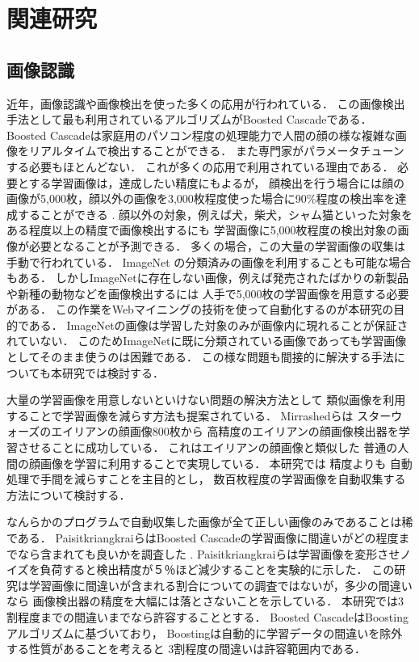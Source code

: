 \chapter{関連研究}
\label{sec:related}

\section{画像認識}

近年，画像認識や画像検出を使った多くの応用が行われている．
この画像検出手法として最も利用されているアルゴリズムがBoosted Cascade\cite{Viola01rapidobject}である．
Boosted Cascadeは家庭用のパソコン程度の処理能力で人間の顔の様な複雑な画像をリアルタイムで検出することができる．
また専門家がパラメータチューンする必要もほとんどない．
これが多くの応用で利用されている理由である．
必要とする学習画像は，達成したい精度にもよるが，
顔検出を行う場合には顔の画像が5,000枚，顔以外の画像を3,000枚程度使った場合に90\%程度の検出率を達成することができる
\cite{Lienhart03empiricalanalysis}
.
顔以外の対象，例えば犬，柴犬，シャム猫といった対象をある程度以上の精度で画像検出するにも
学習画像に5,000枚程度の検出対象の画像が必要となることが予測できる．
多くの場合，この大量の学習画像の収集は手動で行われている．
ImageNet\cite{imagenet}
の分類済みの画像を利用することも可能な場合もある．
しかしImageNetに存在しない画像，例えば発売されたばかりの新製品や新種の動物などを画像検出するには
人手で5,000枚の学習画像を用意する必要がある．
この作業をWebマイニングの技術を使って自動化するのが本研究の目的である．
ImageNetの画像は学習した対象のみが画像内に現れることが保証されていない．
このためImageNetに既に分類されている画像であっても学習画像としてそのまま使うのは困難である．
この様な問題も間接的に解決する手法についても本研究では検討する．

大量の学習画像を用意しないといけない問題の解決方法として
類似画像を利用することで学習画像を減らす方法も提案されている．
Mirrashed\cite{Mirrashed_2013_ICCV}らは
スターウォーズのエイリアンの顔画像800枚から
高精度のエイリアンの顔画像検出器を学習させることに成功している．
これはエイリアンの顔画像と類似した
普通の人間の顔画像を学習に利用することで実現している．
本研究では
精度よりも
自動処理で手間を減らすことを主目的とし，
数百枚程度の学習画像を自動収集する方法について検討する．

なんらかのプログラムで自動収集した画像が全て正しい画像のみであることは稀である．
PaisitkriangkraiらはBoosted Cascadeの学習画像に間違いがどの程度までなら含まれても良いかを調査した
\cite{DBLP:journals/corr/abs-1009-5758}
.
Paisitkriangkraiらは学習画像を変形させノイズを負荷すると検出精度が５％ほど減少することを実験的に示した．
この研究は学習画像に間違いが含まれる割合についての調査ではないが，多少の間違いなら
画像検出器の精度を大幅には落とさないことを示している．
本研究では3割程度までの間違いまでなら許容することとする．
Boosted CascadeはBoostingアルゴリズムに基づいており，
Boostingは自動的に学習データの間違いを除外する性質があることを考えると
3割程度の間違いは許容範囲内である．


